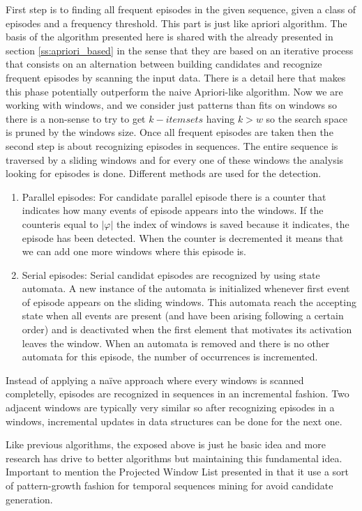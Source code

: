 First step is to finding all frequent episodes in the given sequence, given a
class of episodes and a frequency threshold. This part is just like apriori
algorithm. The basis of the algorithm presented here is shared with the already 
presented in section \ref{ss:apriori_based} in the sense that they are based on an
iterative process that consists on an alternation between building candidates 
and recognize frequent episodes by scanning the input data. There is a detail
here that makes this phase potentially outperform the naive Apriori-like
algorithm. Now we are working with windows, and we consider just patterns than
fits on windows so there is a non-sense to try to get $k-itemsets$ having $k >
w$ so the search space is pruned by the windows size. Once all frequent 
episodes are taken then the second step is about recognizing episodes in 
sequences. The entire sequence is traversed by a sliding windows and for every one of these windows the analysis looking for episodes is done. 
Different methods are used for the detection. 
\begin{enumerate}[label=\roman*)]
  \item Parallel episodes: For candidate parallel episode there is a counter
    that indicates how many events of episode appears into the windows. If the
    counteris equal to $|\varphi|$ the index of windows is saved because it
    indicates, the episode has been detected. When the counter is decremented
    it means that we can add one more windows where this episode is.
  \item Serial episodes: Serial candidat episodes are recognized by using state
    automata. A new instance of the automata is initialized whenever first event
    of episode appears on the sliding windows. This automata reach the accepting
    state when all events are present (and have been arising following a certain
    order) and is deactivated when the first element
    that motivates its activation leaves the window. When an automata is removed
    and there is no other automata for this episode, the number of occurrences
    is incremented.
\end{enumerate}

Instead of applying a naïve approach where every windows is scanned
completelly, episodes are recognized in sequences in an incremental fashion. 
Two adjacent windows are typically very similar so after
recognizing episodes in a windows, incremental updates in data structures can be
done for the next one.

Like previous algorithms, the exposed above is just he basic idea and more
research has drive to better algorithms but maintaining this fundamental idea.
Important to mention the Projected Window List presented in
\cite{huang2004prowl} that it use a sort of pattern-growth fashion for temporal
sequences mining for avoid candidate generation.


